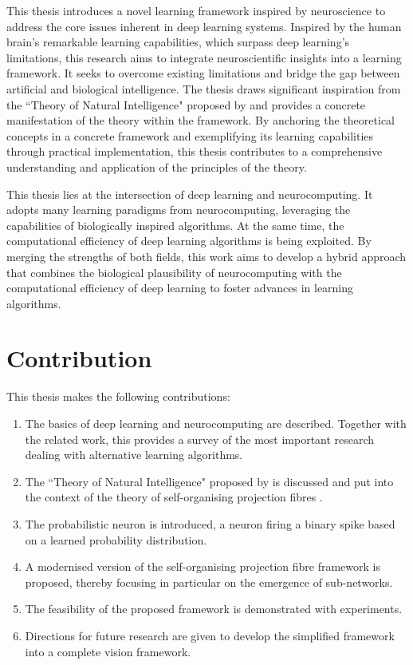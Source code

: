 This thesis introduces a novel learning framework inspired by neuroscience to address the core issues inherent in deep learning systems. Inspired by the human brain's remarkable learning capabilities, which surpass deep learning's limitations, this research aims to integrate neuroscientific insights into a learning framework. It seeks to overcome existing limitations and bridge the gap between artificial and biological intelligence. The thesis draws significant inspiration from the ``Theory of Natural Intelligence" proposed by  and provides a concrete manifestation of the theory within the framework. By anchoring the theoretical concepts in a concrete framework and exemplifying its learning capabilities through practical implementation, this thesis contributes to a comprehensive understanding and application of the principles of the theory.

This thesis lies at the intersection of deep learning and neurocomputing. It adopts many learning paradigms from neurocomputing, leveraging the capabilities of biologically inspired algorithms. At the same time, the computational efficiency of deep learning algorithms is being exploited. By merging the strengths of both fields, this work aims to develop a hybrid approach that combines the biological plausibility of neurocomputing with the computational efficiency of deep learning to foster advances in learning algorithms.


\section{Contribution}
This thesis makes the following contributions:
\begin{enumerate}
	\item The basics of deep learning and neurocomputing are described. Together with the related work, this provides a survey of the most important research dealing with alternative learning algorithms.
	\item The ``Theory of Natural Intelligence" proposed by  is discussed and put into the context of the theory of self-organising projection fibres .
	\item The probabilistic neuron is introduced, a neuron firing a binary spike based on a learned probability distribution.
	\item A modernised version of the self-organising projection fibre framework is proposed, thereby focusing in particular on the emergence of sub-networks.
    \item The feasibility of the proposed framework is demonstrated with experiments.
    \item Directions for future research are given to develop the simplified framework into a complete vision framework.
\end{enumerate}


